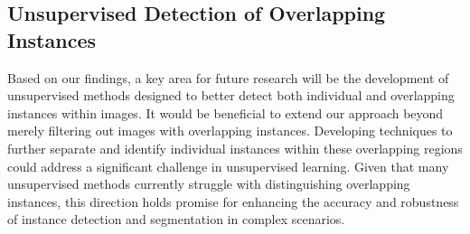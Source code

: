 \subsection{Unsupervised Detection of Overlapping Instances}
Based on our findings, a key area for future research will be the development of unsupervised methods designed to better detect both individual and overlapping instances within images. It would be beneficial to extend our approach beyond merely filtering out images with overlapping instances. Developing techniques to further separate and identify individual instances within these overlapping regions could address a significant challenge in unsupervised learning. Given that many unsupervised methods currently struggle with distinguishing overlapping instances, this direction holds promise for enhancing the accuracy and robustness of instance detection and segmentation in complex scenarios.



